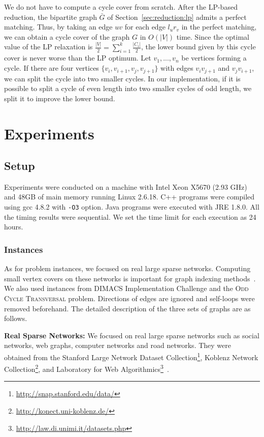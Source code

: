 \documentclass[11pt]{article}
\newcommand{\OCT}{\textsc{Odd Cycle Transversal}\xspace}
\newcommand{\myparagraph}[1]{\vspace{1em}\noindent\textbf{#1:}}
\begin{document}
We do not have to compute a cycle cover from scratch.
After the LP-based reduction, the bipartite graph $\bar{G}$ of Section~\ref{sec:reduction:lp} admits a perfect
matching.
Thus, by taking an edge $uv$ for each edge $l_u r_v$ in the perfect matching, we can obtain a cycle cover of the graph
$G$ in $O(|V|)$ time.
Since the optimal value of the LP relaxation is $\frac{|V|}{2}=\sum_{i=1}^{k}\frac{|C_i|}{2}$, the lower bound given by
this cycle cover is never worse than the LP optimum.
Let $v_1,...,v_n$ be vertices forming a cycle.
If there are four vertices $\{v_i, v_{i+1}, v_j, v_{j+1}\}$ with edges $v_iv_{j+1}$ and $v_jv_{i+1}$, we can split the cycle into two smaller cycles.
In our implementation, if it is possible to split a cycle of even length into two smaller cycles
of odd length, we split it to improve the lower bound.


 \section{Experiments}\label{sec:experiments}
\subsection{Setup}
Experiments were conducted on a machine with Intel
Xeon X5670 (2.93 GHz) and 48GB of main memory
running Linux 2.6.18.
C++ programs were compiled using gcc 4.8.2 with \texttt{-O3} option.
Java programs were executed with JRE 1.8.0.
All the timing results were sequential.
We set the time limit for each execution as 24 hours.


\subsubsection{Instances}
As for problem instances, we focused on real large sparse networks.
Computing small vertex covers on these networks
is important for graph indexing methods~\cite{app/vc_index,app/k-path}.
We also used instances from DIMACS Implementation Challenge and the \OCT problem.
Directions of edges are ignored and self-loops were removed beforehand.
The detailed description of the three sets of graphs are as follows.

\myparagraph{Real Sparse Networks} We focused on real large sparse networks
such as social networks, web graphs, computer networks and road networks.
They were obtained from the Stanford Large Network Dataset Collection\footnote{\url{http://snap.stanford.edu/data/}}, Koblenz Network Collection\footnote{\url{http://konect.uni-koblenz.de/}}, and Laboratory for Web Algorithmics\footnote{\url{http://law.di.unimi.it/datasets.php}}~\cite{datasets/webgraph1,datasets/webgraph2}.
\end{document}
